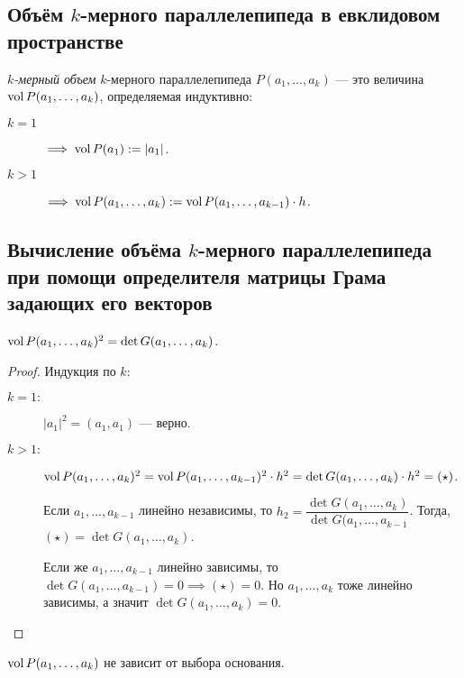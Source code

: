 \subsection{Объём $k$-мерного параллелепипеда в евклидовом пространстве}

\begin{example}
    \textit{$k$-мерный объем} $k$-мерного параллелепипеда $P(a_1, \dots, a_k)$ --- это величина $\operatorname{\mathop{\mathrm{vol}}} P(a_1, \dots, a_k)$, определяемая индуктивно:

    \begin{description}
    \item[$k = 1$] $\implies \operatorname{\mathop{\mathrm{vol}}} P(a_1) := |a_1|$.
    \item[$k > 1$] $\implies \operatorname{\mathop{\mathrm{vol}}} P(a_1, \dots, a_k) := \operatorname{\mathop{\mathrm{vol}}} P(a_1, \dots, a_{k - 1}) \cdot h$.
    \end{description}
\end{example}


\subsection{Вычисление объёма $k$-мерного параллелепипеда при помощи определителя матрицы Грама задающих его векторов}

\begin{theorem}
    $\operatorname{\mathop{\mathrm{vol}}} P(a_1, \dots, a_k)^2 = \det G(a_1, \dots, a_k)$.
\end{theorem}

\begin{proof}
    Индукция по $k$:

    \begin{description}
    \item[$k = 1:$] $|a_1|^2 = (a_1, a_1)$ --- верно.
    \item[$k > 1:$] $\operatorname{\mathop{\mathrm{vol}}} P(a_1, \dots, a_k)^2 = \operatorname{\mathop{\mathrm{vol}}} P(a_1, \dots, a_{k - 1})^2 \cdot h^2 = \det G(a_1, \dots, a_k) \cdot h^2 = (\star)$.

        Если $a_1, \dots, a_{k - 1}$ линейно независимы, то $h_2 = \dfrac{\det G(a_1, \dots, a_k)}{\det G(a_1, \dots, a_{k - 1}}$.
        Тогда, $(\star) = \det G(a_1, \dots, a_k)$.

        Если же $a_1, \dots, a_{k - 1}$ линейно зависимы, то $\det G(a_1, \dots, a_{k - 1}) = 0 \implies (\star) = 0$. Но $a_1, \dots, a_k$ тоже линейно зависимы, а значит $\det G(a_1, \dots, a_k) = 0$.
        \qedhere
    \end{description}
\end{proof}

\begin{corollary}
    $\operatorname{\mathop{\mathrm{vol}}} P(a_1, \dots, a_k)$ не зависит от выбора основания.
\end{corollary}


